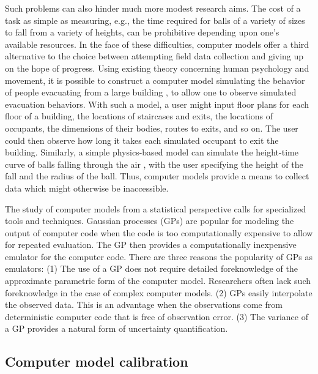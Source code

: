 \documentclass[12pt]{article}
\begin{document}
Such problems can also hinder much more modest research aims.
The cost of a task as simple as measuring, e.g., the time required for balls of a variety of sizes to fall from a variety of heights, can be prohibitive depending upon one's available resources.
In the face of these difficulties, computer models offer a third alternative to the choice between attempting field data collection and giving up on the hope of progress. 
Using existing theory concerning human psychology and movement, it is possible to construct a computer model simulating the behavior of people evacuating from a large building \citep{Thompson1995}, to allow one to observe simulated evacuation behaviors.
With such a model, a user might input floor plans for each floor of a building, the locations of staircases and exits, the locations of occupants, the dimensions of their bodies, routes to exits, and so on. 
The user could then observe how long it takes each simulated occupant to exit the building.
Similarly, a simple physics-based model can simulate the height-time curve of balls falling through the air \citep{Gattiker2017}, with the user specifying the height of the fall and the radius of the ball.
Thus, computer models provide a means to collect data which might otherwise be inaccessible. 

The study of computer models from a statistical perspective calls for specialized tools and techniques. 
Gaussian processes (GPs) are popular for modeling the output of computer code when the code is too computationally expensive to allow for repeated evaluation. 
The GP then provides a computationally inexpensive emulator for the computer code. 
There are three reasons the popularity of GPs as emulators: (1) The use of a GP does not require detailed foreknowledge of the approximate parametric form of the computer model. Researchers often lack such foreknowledge in the case of complex computer models. (2) GPs easily interpolate the observed data. This is an advantage when the observations come from deterministic computer code that is free of observation error. (3) The variance of a GP provides a natural form of uncertainty quantification. 

\subsection{Computer model calibration} \label{computer_model_calibration}
\end{document}
